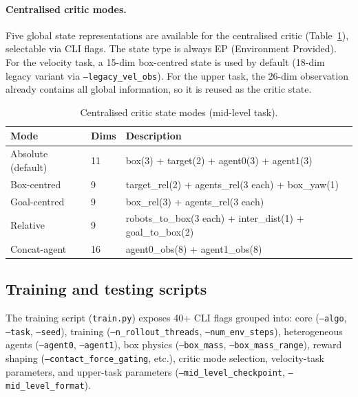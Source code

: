 \begin{dirtree}
\paragraph{Centralised critic modes.}
Five global state representations are available for the centralised critic
(Table~\ref{tab:critic-modes}), selectable via CLI flags. The state type
is always EP (Environment Provided). For the velocity task, a 15-dim
box-centred state is used by default (18-dim legacy variant via
\texttt{--legacy\_vel\_obs}). For the upper task, the 26-dim observation
already contains all global information, so it is reused as the critic state.

\begin{table}[h]
  \centering
  \caption{Centralised critic state modes (mid-level task).}
  \label{tab:critic-modes}
  \begin{tabular}{llp{7cm}}
    \toprule
    \textbf{Mode} & \textbf{Dims} & \textbf{Description} \\
    \midrule
    Absolute (default)         & 11 & box(3) + target(2) + agent0(3) + agent1(3) \\
    Box-centred                & 9  & target\_rel(2) + agents\_rel(3 each) + box\_yaw(1) \\
    Goal-centred               & 9  & box\_rel(3) + agents\_rel(3 each) \\
    Relative                   & 9  & robots\_to\_box(3 each) + inter\_dist(1) + goal\_to\_box(2) \\
    Concat-agent               & 16 & agent0\_obs(8) + agent1\_obs(8) \\
    \bottomrule
  \end{tabular}
\end{table}

\subsection{Training and testing scripts}

The training script (\texttt{train.py}) exposes 40+ CLI flags grouped into:
core (\texttt{--algo}, \texttt{--task}, \texttt{--seed}),
training (\texttt{--n\_rollout\_threads}, \texttt{--num\_env\_steps}),
heterogeneous agents (\texttt{--agent0}, \texttt{--agent1}),
box physics (\texttt{--box\_mass}, \texttt{--box\_mass\_range}),
reward shaping (\texttt{--contact\_force\_gating}, etc.),
critic mode selection,
velocity-task parameters, and
upper-task parameters (\texttt{--mid\_level\_checkpoint}, \texttt{--mid\_level\_format}).


\end{dirtree}
